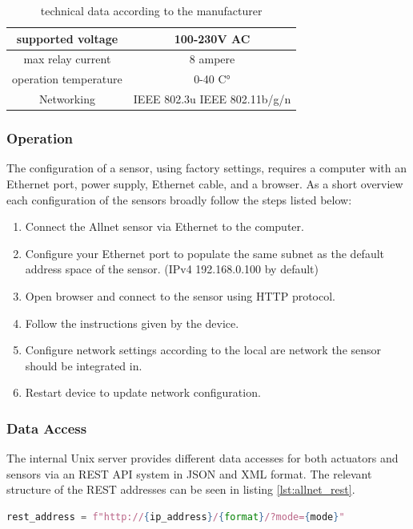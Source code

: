 \begin{table}[b]
    \centering
    \begin{tabular}{cc}
    \hline
        supported voltage & 100-230V AC \\
        \hline
        max relay current & 8 ampere \\
        \hline
        operation temperature & 0-40 C°\\
        \hline
        Networking & IEEE 802.3u IEEE 802.11b/g/n\\
        \hline
    \end{tabular}
    \caption{technical data according to the manufacturer}
    \label{tab:allnet_data}
\end{table}

\subsubsection{Operation}
The configuration of a sensor, using factory settings, requires a computer with an Ethernet port, power supply, Ethernet cable, and a browser. As a short overview each configuration of the sensors  broadly follow the steps listed below:

\begin{enumerate}
	\item Connect the Allnet sensor via Ethernet to the computer.
	\item Configure your Ethernet port to populate the same subnet as the default address space of the sensor. (IPv4 192.168.0.100 by default) 
	\item Open browser and connect to the sensor using HTTP protocol. 
	\item Follow the instructions given by the device.
	\item Configure network settings according to the local are network the sensor should be integrated in.
	\item Restart device to update network configuration.
\end{enumerate}

\subsubsection{Data Access}
The internal Unix server provides different data accesses for both actuators and sensors via an REST API system in JSON and XML format.
The relevant structure of the REST addresses can be seen in listing \ref{lst:allnet_rest}.

    \begin{lstlisting}[language=python, caption={address format of a sensor, provided variable values of a valid ip\_address (0.0.0.0 to 255.255.255.255) a format (xml or json) and a valid mode (all, sensor, ).},label={lst:allnet_rest}]
rest_address = f"http://{ip_address}/{format}/?mode={mode}"
\end{lstlisting}

